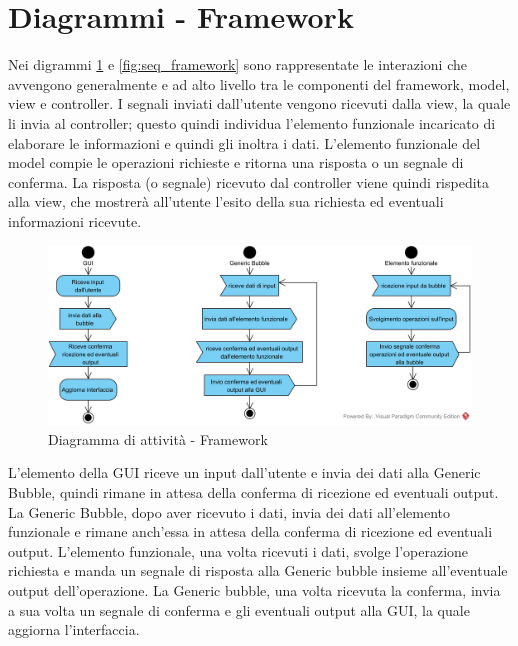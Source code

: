 \section{Diagrammi - Framework}

Nei digrammi \ref{fig:alt_framework} e \ref{fig:seq_framework} sono rappresentate le interazioni che avvengono generalmente e ad alto
livello tra le componenti del framework, model, view e controller. I segnali inviati dall’utente
vengono ricevuti dalla view, la quale li invia al controller; questo quindi individua l’elemento
funzionale incaricato di elaborare le informazioni e quindi gli inoltra i dati. L’elemento funzionale
del model compie le operazioni richieste e ritorna una risposta o un segnale di conferma. La risposta (o segnale) ricevuto dal controller viene quindi rispedita alla view, che mostrerà all’utente l’esito della sua richiesta ed eventuali informazioni ricevute.

\begin{figure}[H]
	\centering
	\includegraphics[width=14cm]{diagrammi_img/attivita/framework.png}
	\caption{Diagramma di attività - Framework}
	\label{fig:alt_framework}
\end{figure}
L'elemento della GUI riceve un input dall'utente e invia dei dati alla Generic Bubble, quindi rimane in attesa della conferma di ricezione ed eventuali output. La Generic Bubble, dopo aver ricevuto i dati, invia dei dati all'elemento funzionale e rimane anch'essa in attesa della conferma di ricezione ed eventuali output. L'elemento funzionale, una volta ricevuti i dati, svolge l'operazione richiesta e manda un segnale di risposta alla Generic bubble insieme all'eventuale output dell'operazione. La Generic bubble, una volta ricevuta la conferma, invia a sua volta un segnale di conferma e gli eventuali output alla GUI, la quale aggiorna l'interfaccia.

